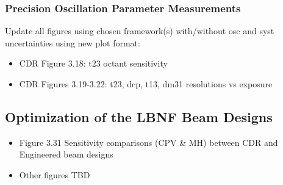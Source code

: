 \subsubsection{Precision Oscillation Parameter Measurements}
Update all figures using chosen framework(s) with/without osc and syst uncertainties using new plot format:
\begin{itemize}
	\item CDR Figure 3.18: t23 octant sensitivity
	\item CDR Figures 3.19-3.22: t23, dcp, t13, dm31 resolutions vs exposure
\end{itemize}

\subsection{Optimization of the LBNF Beam Designs}
\begin{itemize}
\item Figure 3.31 Sensitivity comparisons (CPV \& MH) between CDR and Engineered beam designs
\item Other figures TBD
\end{itemize}
\label{sec:osc-bm-nus}